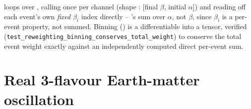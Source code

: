 \begin{implbox}
 loops over , calling
once per channel (shape : [final $\beta$, initial
$\alpha$]) and reading off each event's own \emph{fixed} $\beta_i$ index
directly -- 's sum over $\alpha$, not $\beta$,
since $\beta_i$ is a per-event property, not summed. Binning
() is a differentiable  into a
 tensor, verified (\texttt{test\_reweighting\_binning\_conserves\_total\_weight})
to conserve the total event weight exactly against an independently
computed direct per-event sum.
\end{implbox}

\section{Real 3-flavour Earth-matter oscillation}
\label{sec:earth-oscillation}


